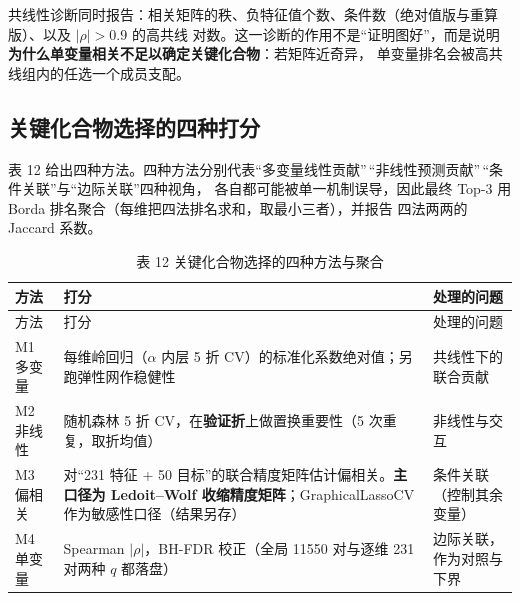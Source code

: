 \documentclass[
  a4paper,12pt]{article}
\begin{document}
共线性诊断同时报告：相关矩阵的秩、负特征值个数、条件数（绝对值版与重算版）、以及
\(|\rho|>0.9\) 的高共线
对数。这一诊断的作用不是``证明图好''，而是说明\textbf{为什么单变量相关不足以确定关键化合物}：若矩阵近奇异，
单变量排名会被高共线组内的任选一个成员支配。

\subsection{关键化合物选择的四种打分}\label{ux5173ux952eux5316ux5408ux7269ux9009ux62e9ux7684ux56dbux79cdux6253ux5206}

表 12
给出四种方法。四种方法分别代表``多变量线性贡献''\,``非线性预测贡献''\,``条件关联''与``边际关联''四种视角，
各自都可能被单一机制误导，因此最终 Top-3 用 Borda
排名聚合（每维把四法排名求和，取最小三者），并报告 四法两两的 Jaccard
系数。

\begin{longtable}[]{@{}
  >{\raggedright\arraybackslash}p{}
  >{\raggedright\arraybackslash}p{}
  >{\raggedright\arraybackslash}p{}@{}}
\caption{表 12 关键化合物选择的四种方法与聚合}\tabularnewline
\toprule\noalign{}
\begin{minipage}[b]{\linewidth}\raggedright
方法
\end{minipage} & \begin{minipage}[b]{\linewidth}\raggedright
打分
\end{minipage} & \begin{minipage}[b]{\linewidth}\raggedright
处理的问题
\end{minipage} \\
\midrule\noalign{}
\endfirsthead
\toprule\noalign{}
\begin{minipage}[b]{\linewidth}\raggedright
方法
\end{minipage} & \begin{minipage}[b]{\linewidth}\raggedright
打分
\end{minipage} & \begin{minipage}[b]{\linewidth}\raggedright
处理的问题
\end{minipage} \\
\midrule\noalign{}
\endhead
\bottomrule\noalign{}
\endlastfoot
M1 多变量 & 每维岭回归（\(\alpha\) 内层 5 折
CV）的标准化系数绝对值；另跑弹性网作稳健性 & 共线性下的联合贡献 \\
M2 非线性 & 随机森林 5 折 CV，在\textbf{验证折}上做置换重要性（5
次重复，取折均值） & 非线性与交互 \\
M3 偏相关 & 对``231 特征 + 50
目标''的联合精度矩阵估计偏相关。\textbf{主口径为 Ledoit--Wolf
收缩精度矩阵}；GraphicalLassoCV 作为敏感性口径（结果另存） &
条件关联（控制其余变量） \\
M4 单变量 & Spearman \(|\rho|\)，BH-FDR 校正（全局 11550 对与逐维 231
对两种 \(q\) 都落盘） & 边际关联，作为对照与下界 \\
\end{longtable}
\end{document}
